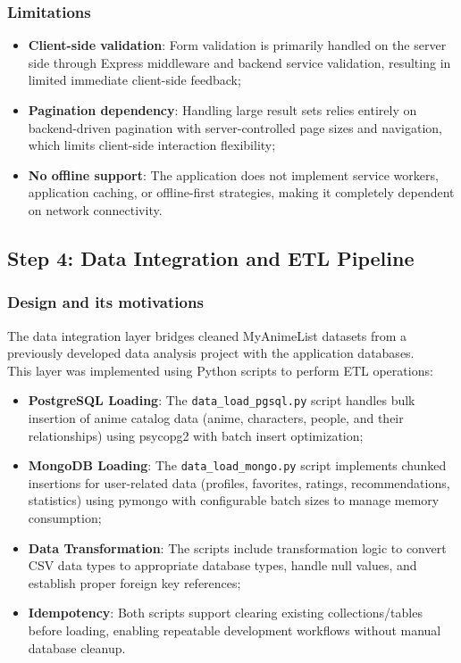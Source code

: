 \documentclass[11pt,a4paper]{article}
\begin{document}
\subsubsection{Limitations}
\begin{itemize}
    \item \textbf{Client-side validation}: Form validation is primarily handled on the server side through Express middleware and backend service validation, resulting in limited immediate client-side feedback;
    \item \textbf{Pagination dependency}: Handling large result sets relies entirely on backend-driven pagination with server-controlled page sizes and navigation, which limits client-side interaction flexibility;
    \item \textbf{No offline support}: The application does not implement service workers, application caching, or offline-first strategies, making it completely dependent on network connectivity.
\end{itemize}




\newpage
\subsection{Step 4: Data Integration and ETL Pipeline}

\subsubsection{Design and its motivations}
The data integration layer bridges cleaned MyAnimeList datasets from a previously developed data analysis project with the application databases.\\This layer was implemented using Python scripts to perform ETL operations:

\begin{itemize}
    \item \textbf{PostgreSQL Loading}: The \texttt{data\_load\_pgsql.py} script handles bulk insertion of anime catalog data (anime, characters, people, and their relationships) using psycopg2 with batch insert optimization;
    \item \textbf{MongoDB Loading}: The \texttt{data\_load\_mongo.py} script implements chunked insertions for user-related data (profiles, favorites, ratings, recommendations, statistics) using pymongo with configurable batch sizes to manage memory consumption;
    \item \textbf{Data Transformation}: The scripts include transformation logic to convert CSV data types to appropriate database types, handle null values, and establish proper foreign key references;
    \item \textbf{Idempotency}: Both scripts support clearing existing collections/tables before loading, enabling repeatable development workflows without manual database cleanup.
\end{itemize}
\end{document}
